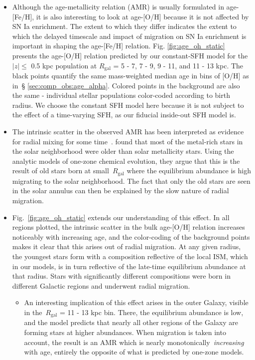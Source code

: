 \documentclass[fleqn, usenatbib]{mnras}
\begin{document}
\begin{itemize} 
	\item Although the age-metallicity relation (AMR) is usually formulated in 
	age-[Fe/H], it is also interesting to look at age-[O/H] because it is not 
	affected by SN Ia enrichment. The extent to which they differ indicates the 
	extent to which the delayed timescale and impact of migration on SN Ia 
	enrichment is important in shaping the age-[Fe/H] relation. Fig. 
	\ref{fig:age_oh_static} presents the age-[O/H] relation predicted by our 
	constant-SFH model for the~$\left|z\right|\leq$ 0.5 kpc population at 
	$R_\text{gal}$ = 5 - 7, 7 - 9, 9 - 11, and 11 - 13 kpc. The black points 
	quantify the same mass-weighted median age in bins of [O/H] as in~\S 
	\ref{sec:comp_obs:age_alpha}. Colored points in the background are also the 
	same - individual stellar populations color-coded according to birth 
	radius. We choose the constant SFH model here because it is not subject to 
	the effect of a time-varying SFH, as our fiducial inside-out SFH model is. 

	\item The intrinsic scatter in the observed AMR has been interpreted as 
	evidence for radial mixing for some time~\citep[e.g.][]{Edvardsson1993}. 
	\citet{Feuillet2018} found that most of the metal-rich stars in the solar 
	neighborhood were older than solar metallicity stars. Using the 
	\citet{Weinberg2017} analytic models of one-zone chemical evolution, they 
	argue that this is the result of old stars born at small~$R_\text{gal}$ 
	where the equilibrium abundance is high migrating to the solar 
	neighborhood. The fact that only the old stars are seen in the solar 
	annulus can then be explained by the slow nature of radial migration. 

	\item Fig.~\ref{fig:age_oh_static} extends our understanding of this 
	effect. In all regions plotted, the intrinsic scatter in the bulk 
	age-[O/H] relation increases noticeably with increasing age, and the 
	color-coding of the background points makes it clear that this arises out 
	of radial migration. At any given radius, the youngest stars form with a 
	composition reflective of the local ISM, which in our models, is in turn 
	reflective of the late-time equilibrium abundance at that radius. Stars 
	with significantly different compositions were born in different Galactic 
	regions and underwent radial migration. 
	\begin{itemize} 
		\item An interesting implication of this effect arises in the outer 
		Galaxy, visible in the~$R_\text{gal}$ = 11 - 13 kpc bin. There, the 
		equilibrium abundance is low, and the model predicts that nearly all 
		other regions of the Galaxy are forming stars at higher abundances. 
		When migration is taken into account, the result is an AMR which is 
		nearly monotonically~\textit{increasing} with age, entirely the 
		opposite of what is predicted by one-zone models. 
	\end{itemize} 


\end{itemize}
\end{document}

